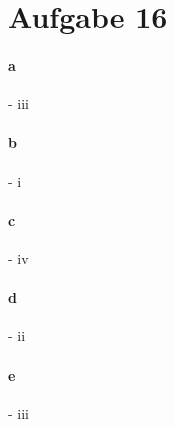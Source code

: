 \documentclass[12pt,a4paper]{article}
\begin{document}
\section*{Aufgabe 16}
\paragraph{a} - iii
\paragraph{b} - i
\paragraph{c} - iv
\paragraph{d} - ii
\paragraph{e} - iii
\end{document}
